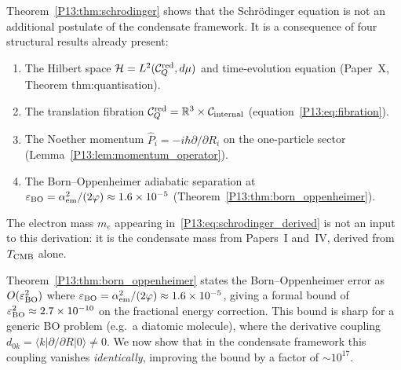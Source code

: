 \begin{remark}
\label{P13:rem:what_derived}
Theorem~\ref{P13:thm:schrodinger} shows that the Schr\"odinger equation
is not an additional postulate of the condensate framework.
It is a consequence of four structural results already present:
\begin{enumerate}[noitemsep]
  \item The Hilbert space $\mathcal{H}=L^2(\mathcal{C}_Q^{\rm red},d\mu)$
    and time-evolution equation (Paper~X, Theorem thm:quantisation).
  \item The translation fibration $\mathcal{C}_Q^{\rm red}=\mathbb{R}^3\times
    \mathcal{C}_{\rm internal}$ (equation~\eqref{P13:eq:fibration}).
  \item The Noether momentum $\hat{P}_i=-i\hbar\partial/\partial R_i$
    on the one-particle sector (Lemma~\ref{P13:lem:momentum_operator}).
  \item The Born--Oppenheimer adiabatic separation at
    $\varepsilon_{\rm BO}=\alpha_{\mathrm{em}}^2/(2\varphi)\approx1.6\times10^{-5}$
    (Theorem~\ref{P13:thm:born_oppenheimer}).
\end{enumerate}
The electron mass $m_e$ appearing in~\eqref{P13:eq:schrodinger_derived}
is not an input to this derivation: it is the condensate mass
from Papers~I and~IV, derived from $T_{\mathrm{CMB}}$ alone.
\end{remark}

\begin{remark}
\label{P13:rem:BO_correction}
Theorem~\ref{P13:thm:born_oppenheimer} states the Born--Oppenheimer error as
$O(\varepsilon_{\rm BO}^2)$ where $\varepsilon_{\rm BO}=\alpha_{\mathrm{em}}^2/(2\varphi)\approx1.6\times10^{-5}$,
giving a formal bound of $\varepsilon_{\rm BO}^2\approx2.7\times10^{-10}$
on the fractional energy correction.
This bound is sharp for a generic BO problem (e.g.\ a diatomic molecule),
where the derivative coupling $d_{0k}=\langle k|\partial/\partial R|0\rangle\neq0$.
We now show that in the condensate framework this coupling vanishes
\emph{identically}, improving the bound by a factor of $\sim10^{17}$.
\end{remark}

